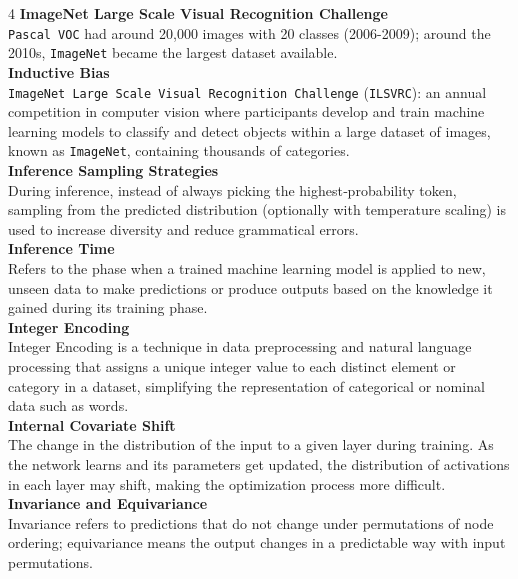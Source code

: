 \documentclass[8pt]{extarticle}
\begin{document}
\begin{multicols}{4}
\vspace{2pt}\textbf{ImageNet Large Scale Visual Recognition Challenge}\\
\texttt{Pascal VOC} had around 20,000 images with 20 classes (2006-2009); around the 2010s, \texttt{ImageNet} became the largest dataset available.\\
\vspace{2pt}\textbf{Inductive Bias}\\
\texttt{ImageNet Large Scale Visual Recognition Challenge} (\texttt{ILSVRC}): an annual competition in computer vision where participants develop and train machine learning models to classify and detect objects within a large dataset of images, known as \texttt{ImageNet}, containing thousands of categories.\\
\vspace{2pt}\textbf{Inference Sampling Strategies}\\
During inference, instead of always picking the highest‑probability token, sampling from the predicted distribution (optionally with temperature scaling) is used to increase diversity and reduce grammatical errors.\\
\vspace{2pt}\textbf{Inference Time}\\
Refers to the phase when a trained machine learning model is applied to new, unseen data to make predictions or produce outputs based on the knowledge it gained during its training phase.\\
\vspace{2pt}\textbf{Integer Encoding}\\
Integer Encoding is a technique in data preprocessing and natural language processing that assigns a unique integer value to each distinct element or category in a dataset, simplifying the representation of categorical or nominal data such as words.\\
\vspace{2pt}\textbf{Internal Covariate Shift}\\
The change in the distribution of the input to a given layer during training. As the network learns and its parameters get updated, the distribution of activations in each layer may shift, making the optimization process more difficult.\\
\vspace{2pt}\textbf{Invariance and Equivariance}\\
Invariance refers to predictions that do not change under permutations of node ordering; equivariance means the output changes in a predictable way with input permutations.\\

\end{multicols}
\end{document}
